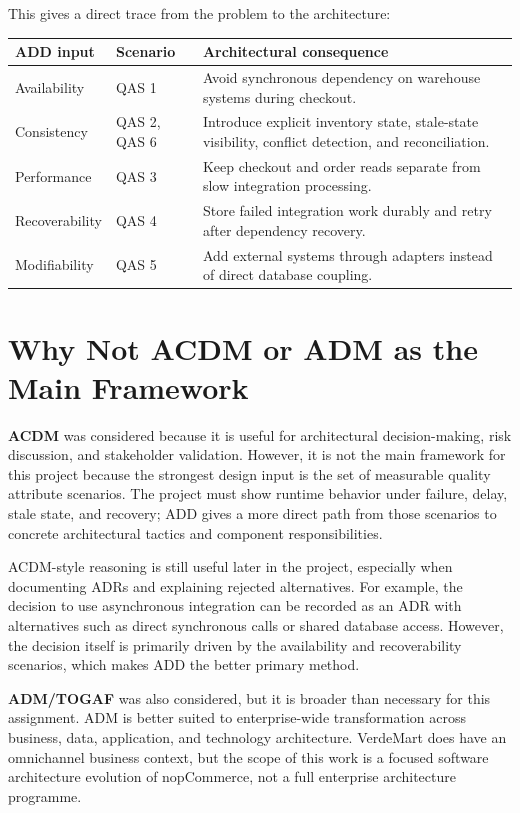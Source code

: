 This gives a direct trace from the problem to the architecture:

\begin{center}
\begin{tabular}{|p{}|p{}|p{}|}
\hline
\textbf{ADD input} & \textbf{Scenario} & \textbf{Architectural consequence} \\
\hline
Availability & QAS 1 & Avoid synchronous dependency on warehouse systems during checkout. \\
\hline
Consistency & QAS 2, QAS 6 & Introduce explicit inventory state, stale-state visibility, conflict detection, and reconciliation. \\
\hline
Performance & QAS 3 & Keep checkout and order reads separate from slow integration processing. \\
\hline
Recoverability & QAS 4 & Store failed integration work durably and retry after dependency recovery. \\
\hline
Modifiability & QAS 5 & Add external systems through adapters instead of direct database coupling. \\
\hline
\end{tabular}
\end{center}

\section{Why Not ACDM or ADM as the Main Framework}

\textbf{ACDM} was considered because it is useful for architectural decision-making, risk
discussion, and stakeholder validation. However, it is not the main framework for this project
because the strongest design input is the set of measurable quality attribute scenarios. The
project must show runtime behavior under failure, delay, stale state, and recovery; ADD gives a
more direct path from those scenarios to concrete architectural tactics and component
responsibilities.

ACDM-style reasoning is still useful later in the project, especially when documenting ADRs and
explaining rejected alternatives. For example, the decision to use asynchronous integration can
be recorded as an ADR with alternatives such as direct synchronous calls or shared database
access. However, the decision itself is primarily driven by the availability and recoverability
scenarios, which makes ADD the better primary method.

\textbf{ADM/TOGAF} was also considered, but it is broader than necessary for this assignment.
ADM is better suited to enterprise-wide transformation across business, data, application, and
technology architecture. VerdeMart does have an omnichannel business context, but the scope of
this work is a focused software architecture evolution of nopCommerce, not a full enterprise
architecture programme.

